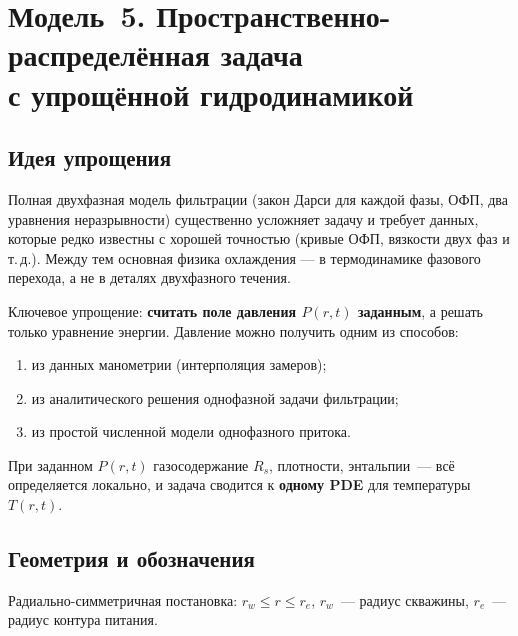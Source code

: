 \documentclass[12pt,a4paper]{article}
\begin{document}
\section{Модель~5. Пространственно-распределённая задача\\
с упрощённой гидродинамикой}

\subsection{Идея упрощения}

Полная двухфазная модель фильтрации (закон Дарси для каждой фазы,
ОФП, два уравнения неразрывности) существенно усложняет задачу и
требует данных, которые редко известны с хорошей точностью (кривые
ОФП, вязкости двух фаз и т.\,д.). Между тем основная физика
охлаждения --- в термодинамике фазового перехода, а не в деталях
двухфазного течения.

Ключевое упрощение: \textbf{считать поле давления $P(r,t)$ заданным},
а решать только уравнение энергии. Давление можно получить одним из
способов:
\begin{enumerate}[nosep]
  \item из данных манометрии (интерполяция замеров);
  \item из аналитического решения однофазной задачи фильтрации;
  \item из простой численной модели однофазного притока.
\end{enumerate}

При заданном $P(r,t)$ газосодержание $R_s$, плотности, энтальпии~---
всё определяется локально, и задача сводится к \textbf{одному PDE}
для температуры~$T(r,t)$.

\subsection{Геометрия и обозначения}

Радиально-симметричная постановка: $r_w \leqslant r \leqslant r_e$,
$r_w$~--- радиус скважины, $r_e$~--- радиус контура питания.
\end{document}
